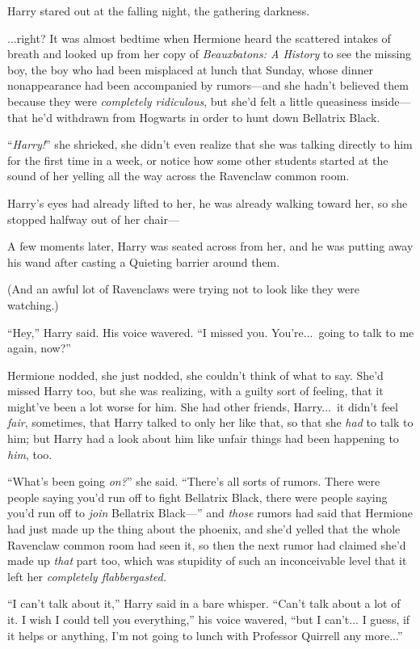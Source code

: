 Harry stared out at the falling night, the gathering darkness.

...right?
\sbreak
It was almost bedtime when Hermione heard the scattered intakes of breath and looked up from her copy of \emph{Beauxbatons: A History} to see the missing boy, the boy who had been misplaced at lunch that Sunday, whose dinner nonappearance had been accompanied by rumors—and she hadn’t believed them because they were \emph{completely ridiculous}, but she’d felt a little queasiness inside—that he’d withdrawn from Hogwarts in order to hunt down Bellatrix Black.

“\emph{Harry!}” she shrieked, she didn’t even realize that she was talking directly to him for the first time in a week, or notice how some other students started at the sound of her yelling all the way across the Ravenclaw common room.

Harry’s eyes had already lifted to her, he was already walking toward her, so she stopped halfway out of her chair—

A few moments later, Harry was seated across from her, and he was putting away his wand after casting a Quieting barrier around them.

(And an awful lot of Ravenclaws were trying not to look like they were watching.)

“Hey,” Harry said. His voice wavered. “I missed you. You’re...\ going to talk to me again, now?”

Hermione nodded, she just nodded, she couldn’t think of what to say. She’d missed Harry too, but she was realizing, with a guilty sort of feeling, that it might’ve been a lot worse for him. She had other friends, Harry...\ it didn’t feel \emph{fair}, sometimes, that Harry talked to only her like that, so that she \emph{had} to talk to him; but Harry had a look about him like unfair things had been happening to \emph{him}, too.

“What’s been going \emph{on?}” she said. “There’s all sorts of rumors. There were people saying you’d run off to fight Bellatrix Black, there were people saying you’d run off to \emph{join} Bellatrix Black—” and \emph{those} rumors had said that Hermione had just made up the thing about the phoenix, and she’d yelled that the whole Ravenclaw common room had seen it, so then the next rumor had claimed she’d made up \emph{that} part too, which was stupidity of such an inconceivable level that it left her \emph{completely flabbergasted.}

“I can’t talk about it,” Harry said in a bare whisper. “Can’t talk about a lot of it. I wish I could tell you everything,” his voice wavered, “but I can’t... I guess, if it helps or anything, I’m not going to lunch with Professor Quirrell any more...”


